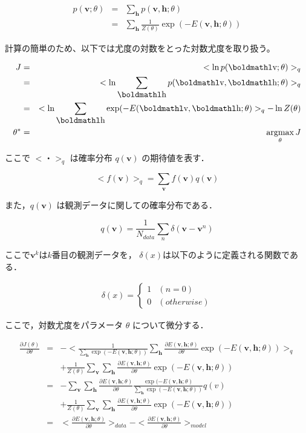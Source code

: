 \begin{eqnarray}
	p(\bm{v};\theta) & = & \sum_{\bm{h}} p(\bm{v},\bm{h};\theta) \\
				& = & \sum_{\bm{h}} \frac{1}{Z(\theta)} \exp (-E(\bm{v}, \bm{h}; \theta))
\end{eqnarray}

計算の簡単のため、以下では尤度の対数をとった対数尤度を取り扱う。

\begin{eqnarray}
	J & = & < \ln p(\bm{v}; \theta) >_q \\
	  & = & < \ln \sum_{\bm{h}} p(\bm{v}, \bm{h}; \theta) >_q \\
	  & = & < \ln \sum_{\bm{h}} \exp (-E(\bm{v}, \bm{h}; \theta) >_q - \ln Z(\theta) \\
	\theta ^* & = & \argmax_\theta  J
\end{eqnarray}

ここで $<・>_q$ は確率分布 $q(\bm{v})$ の期待値を表す．

\begin{equation}
	<f(\bm{v})>_q= \sum_{\bm{v}} f(\bm{v}) q(\bm{v})
\end{equation}

また，$q(\bm{v})$ は観測データに関しての確率分布である．

\begin{equation}
	q(\bm{v}) = \frac{1}{N_{data}} \sum_n \delta(\bm{v}-\bm{v}^n)
\end{equation}

ここで$\bm{v}^k$は$k$番目の観測データを，
$ \delta(x)$は以下のように定義される関数である．

\begin{eqnarray}
\delta(x) = \begin{cases}
    1 & (n=0) \\
    0 & (otherwise)
  \end{cases}
\end{eqnarray}

ここで，対数尤度をパラメータ $ \theta $ について微分する．

\begin{eqnarray}
\frac {\partial J(\theta)}{\partial \theta} & = & 
	-<\frac{1}{\sum_{\bm{h}} \exp (-E(\bm{v}, \bm{h}; \theta))} 
	\sum_{\bm{h}} \frac{\partial E(\bm{v},\bm{h};\theta)}{\partial \theta} \exp(-E(\bm{v},\bm{h};\theta)) >_{q} \nonumber \\
	& & + \frac{1}{Z(\theta)} \sum_{\bm{v}} \sum_{\bm{h}} \frac{\partial E(\bm{v},\bm{h};\theta)}{ \partial \theta} \exp(-E(\bm{v},\bm{h};\theta))
\\
	& = & - \sum_{\bm{v}} \sum_{\bm{h}} \frac{\partial E(\bm{v},\bm{h};\theta)}{\partial \theta}
	\frac{\exp (-E(\bm{v},\bm{h};\theta)}{\sum_{\bm{h}} \exp(-E(\bm{v},\bm{h};\theta))} q(v) \nonumber \\
	& & + \frac{1}{Z(\theta)} \sum_{\bm{v}} \sum_{\bm{h}} \frac{\partial E(\bm{v},\bm{h};\theta)}{ \partial \theta} \exp(-E(\bm{v},\bm{h};\theta))
\\
	& = & < \frac{\partial E(\bm{v},\bm{h};\theta)}{ \partial \theta} >_{data}
	 - <\frac{\partial E(\bm{v},\bm{h};\theta)}{ \partial \theta} >_{model}
	 \label{eqa:pos_neg}
\end{eqnarray}


